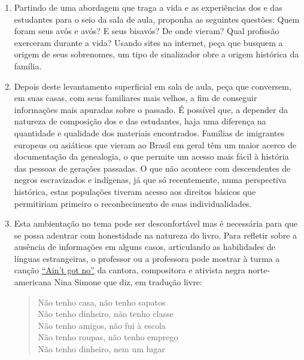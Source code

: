 \documentclass[11pt]{extarticle}
\begin{document}
\begin{enumerate}

  \item
  Partindo de uma abordagem que traga a vida e as experiências dos e das estudantes para
  o seio da sala de aula, proponha as seguintes questões: Quem foram seus avôs e avós?
  E seus bisavós? De onde vieram? Qual profissão exerceram durante a vida? 
  Usando sites na internet, peça que busquem a origem de seus sobrenomes, um tipo
  de sinalizador obre a origem histórica da família. 

  \item
  Depois deste levantamento superficial em sala de aula, peça que conversem, em suas
  casas, com seus familiares mais velhos, a fim de conseguir informações mais apuradas
  sobre o passado. É possível que, a depender da natureza de composição dos e das estudantes, 
  haja uma diferença na quantidade e qualidade dos
  materiais encontrados. Famílias de imigrantes europeus ou asiáticos que vieram
  ao Brasil em geral têm um maior acerco de documentação da genealogia, o que
  permite um acesso mais fácil à história das pessoas de gerações passadas. 
  O que não acontece com descendentes de negros escravizados e indígenas, já
  que só recentemente, numa perspectiva histórica, estas populações tiveram acesso 
  aos direitos básicos que permitiriam primeiro o reconhecimento de suas
  individualidades. 

  \item
  Esta ambientação no tema pode ser desconfortável mas é necessária para 
  que se possa adentrar com honestidade na natureza do livro. Para refletir
  sobre a ausência de informações em alguns casos, articulando as habilidades de 
  línguas estrangeiras, o professor ou a professora pode mostrar à turma a canção 
  \href{https://www.youtube.com/watch?v=L5jI9I03q8E}{``Ain't got no''} da cantora, compositora e ativista negra norte-americana 
  Nina Simone que diz, em tradução livre:


\begin{verse}
Não tenho casa, não tenho sapatos\\
Não tenho dinheiro, não tenho classe\\
Não tenho amigos, não fui à escola\\
Não tenho roupas, não tenho emprego\\
Não tenho dinheiro, nem um lugar\\


\end{verse}
\end{enumerate}
\end{document}

